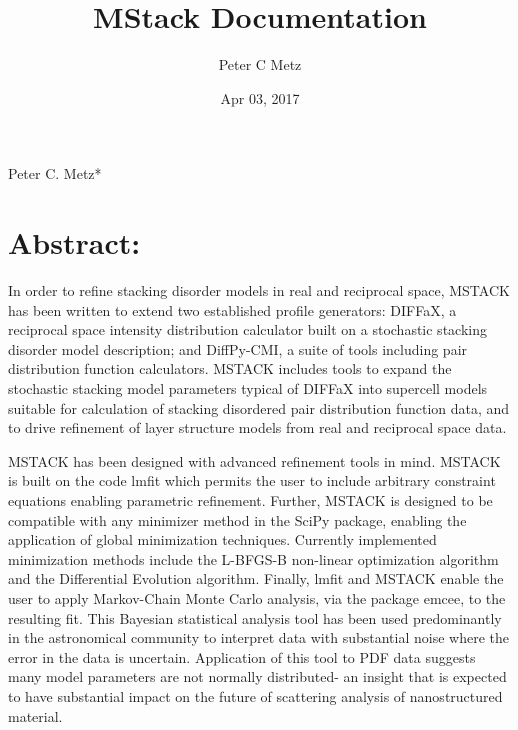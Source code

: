 \documentclass[letterpaper,10pt,english]{sphinxmanual}
\title{MStack Documentation}
\date{Apr 03, 2017}
\author{Peter C Metz}
\begin{document}
\maketitle
\sphinxtableofcontents
{}\label{\detokenize{index::doc}}


\begin{DUlineblock}{0em}
\item[] Peter C. Metz*
\item[] 
\item[] 
\end{DUlineblock}


\chapter{Abstract:}
\label{\detokenize{index:abstract}}\label{\detokenize{index:mstack-stacking-disorder-tools-for-python}}
In order to refine stacking disorder models in real and reciprocal space, MSTACK has been written to
extend two established profile generators: DIFFaX, a reciprocal space intensity distribution calculator
built on a stochastic stacking disorder model description; and DiffPy-CMI, a suite of tools including pair
distribution function calculators. MSTACK includes tools to expand the stochastic stacking model parameters
typical of DIFFaX into supercell models suitable for calculation of stacking disordered pair distribution function
data, and to drive refinement of layer structure models from real and reciprocal space data.

MSTACK has been designed with advanced refinement tools in mind. MSTACK is built on the code lmfit which
permits the user to include arbitrary constraint equations enabling parametric refinement. Further, MSTACK
is designed to be compatible with any minimizer method in the SciPy package, enabling the application of
global minimization techniques. Currently implemented minimization methods include the L-BFGS-B non-linear
optimization algorithm and the Differential Evolution algorithm. Finally, lmfit and MSTACK enable the user to
apply Markov-Chain Monte Carlo analysis, via the package emcee, to the resulting fit. This Bayesian statistical
analysis tool has been used predominantly in the astronomical community to interpret data with substantial noise
where the error in the data is uncertain. Application of this tool to PDF data suggests many model parameters are
not normally distributed- an insight that is expected to have substantial impact on the future of scattering analysis
of nanostructured material.
\end{document}
